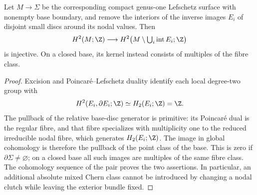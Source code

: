 \begin{lemma}
Let $M\to\Sigma$ be the corresponding compact genus-one Lefschetz
surface with nonempty base boundary, and remove the interiors of
the inverse images $E_i$ of disjoint small discs around its nodal
values.  Then
\[
 H^2(M;\Z)\longrightarrow
 H^2\bigl(M\setminus\textstyle\bigcup_i\operatorname{int}E_i;\Z\bigr)
\]
is injective.  On a closed base, its kernel instead consists of
multiples of the fibre class.
\end{lemma}
\begin{proof}
Excision and Poincar\'e--Lefschetz duality identify each local
degree-two group with
\[
 H^2(E_i,\partial E_i;\Z)\simeq H_2(E_i;\Z)=\Z.
\]
The pullback of the relative base-disc generator is primitive:
its Poincar\'e dual is the regular fibre, and that fibre specializes
with multiplicity one to the reduced irreducible nodal fibre,
which generates $H_2(E_i;\Z)$.  The image in global cohomology is
therefore the pullback of the point class of the base.  This is
zero if $\partial\Sigma\ne\varnothing$; on a closed base all such
images are multiples of the same fibre class.  The cohomology
sequence of the pair proves the two assertions.  In particular,
an additional absolute mixed Chern class cannot be introduced by
changing a nodal clutch while leaving the exterior bundle fixed.
\end{proof}

